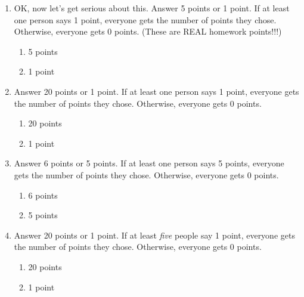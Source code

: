 \begin{enumerate}
\item OK, now let's get serious about this. Answer 5 points or 1 point. If at least one person says 1 point, everyone gets the number of points they chose. Otherwise, everyone gets 0 points. (These are REAL homework points!!!)

\begin{enumerate}
\item 5 points
\item 1 point
\end{enumerate}

\item Answer 20 points or 1 point. If at least one person says 1 point, everyone gets the number of points they chose. Otherwise, everyone gets 0 points.

\begin{enumerate}
\item 20 points
\item 1 point
\end{enumerate}

\item Answer 6 points or 5 points. If at least one person says 5 points, everyone gets the number of points they chose. Otherwise, everyone gets 0 points.

\begin{enumerate}
\item 6 points
\item 5 points
\end{enumerate}

\item Answer 20 points or 1 point. If at least {\it five}  people say 1 point, everyone gets the number of points they chose. Otherwise, everyone gets 0 points.

\begin{enumerate}
\item 20 points
\item 1 point
\end{enumerate}



\end{enumerate}